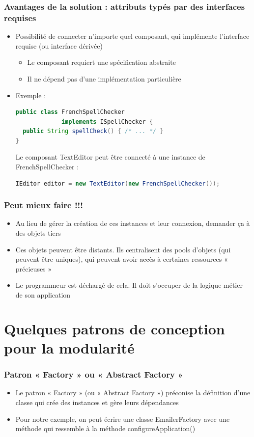 \documentclass{beamer}
\begin{document}
\begin{frame}[fragile]
  \frametitle{Avantages de la solution : attributs typés par des
    interfaces requises}
  \begin{itemize}
  \item Possibilité de connecter n'importe quel composant, qui implémente
    l'interface requise (ou interface dérivée)
  \begin{itemize}   
  \item Le composant requiert une spécification abstraite
  \item Il ne dépend pas d'une implémentation particulière
  \end{itemize}
\item Exemple :
  \begin{lstlisting}[language=Java]
public class FrenchSpellChecker
             implements ISpellChecker {
  public String spellCheck() { /* ... */ }
}
\end{lstlisting}
Le composant TextEditor peut être connecté à une instance
de FrenchSpellChecker :
  \begin{lstlisting}[language=Java]
IEditor editor = new TextEditor(new FrenchSpellChecker());
\end{lstlisting}
  \end{itemize}
\end{frame}

\begin{frame}
  \frametitle{Peut mieux faire !!!}
  \begin{itemize}
  \item Au lieu de gérer la création de ces instances et leur
    connexion, demander ça à des objets tiers
  \item Ces objets peuvent être distants. Ils centralisent des pools
    d'objets (qui peuvent être uniques), qui peuvent avoir accès à
    certaines ressources « précieuses »
  \item Le programmeur est déchargé de cela. Il doit s'occuper de la
    logique métier de son application
  \end{itemize}
\end{frame}


\section{Quelques patrons de conception pour la modularité}

\begin{frame}
  \frametitle{Patron « Factory » ou « Abstract Factory »}  
  \begin{itemize}
  \item Le patron « Factory » (ou « Abstract Factory ») préconise la
    définition d'une classe qui crée des instances et gère leurs
    dépendances
  \item Pour notre exemple, on peut écrire une classe EmailerFactory
    avec une méthode qui ressemble à la méthode configureApplication()
  \end{itemize}
\end{frame}
\end{document}
